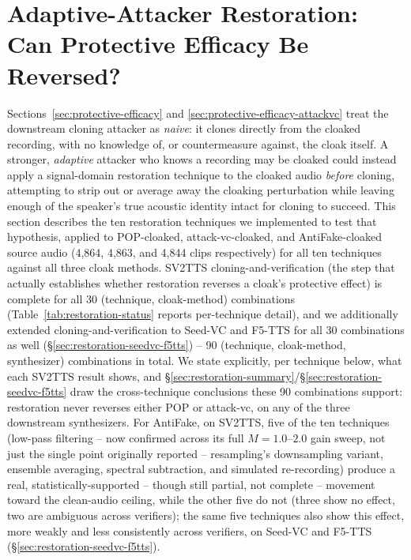 \documentclass[11pt]{article}
\begin{document}
\section{Adaptive-Attacker Restoration: Can Protective Efficacy Be Reversed?}
\label{sec:restoration}

Sections~\ref{sec:protective-efficacy} and
\ref{sec:protective-efficacy-attackvc} treat the downstream cloning
attacker as \emph{naive}: it clones directly from the cloaked
recording, with no knowledge of, or countermeasure against, the cloak
itself. A stronger, \emph{adaptive} attacker who knows a recording may
be cloaked could instead apply a signal-domain restoration technique
to the cloaked audio \emph{before} cloning, attempting to strip out or
average away the cloaking perturbation while leaving enough of the
speaker's true acoustic identity intact for cloning to succeed. This
section describes the ten restoration techniques we implemented to
test that hypothesis, applied to POP-cloaked, attack-vc-cloaked, and
AntiFake-cloaked source audio (4,864, 4,863, and 4,844 clips
respectively) for all ten techniques against all three cloak methods.
SV2TTS cloning-and-verification (the step that actually establishes
whether restoration reverses a cloak's protective effect) is complete
for all 30 (technique, cloak-method) combinations
(Table~\ref{tab:restoration-status} reports per-technique detail), and
we additionally extended cloning-and-verification to Seed-VC and
F5-TTS for all 30 combinations as well (\S\ref{sec:restoration-seedvc-f5tts}) --
90 (technique, cloak-method, synthesizer) combinations in total. We
state explicitly, per technique below, what each SV2TTS result shows,
and \S\ref{sec:restoration-summary}/\S\ref{sec:restoration-seedvc-f5tts}
draw the cross-technique conclusions these 90 combinations support:
restoration never reverses either POP or attack-vc, on any of the three
downstream synthesizers. For AntiFake, on SV2TTS, five of the ten
techniques (low-pass filtering -- now confirmed across its full
$M=1.0$--$2.0$ gain sweep, not just the single point originally
reported -- resampling's downsampling variant, ensemble averaging,
spectral subtraction, and simulated re-recording) produce a real,
statistically-supported -- though still partial, not complete --
movement toward the clean-audio ceiling, while the other five do not
(three show no effect, two are ambiguous across verifiers); the same
five techniques also show this effect, more weakly and less
consistently across verifiers, on Seed-VC and F5-TTS
(\S\ref{sec:restoration-seedvc-f5tts}).
\end{document}
